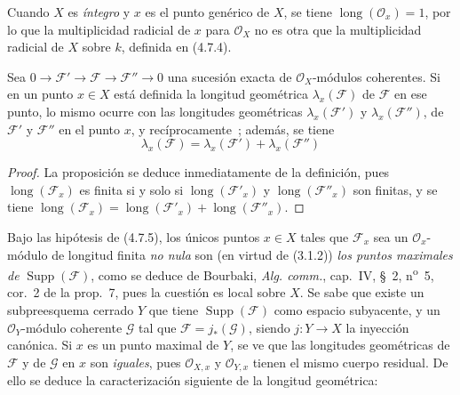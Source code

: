 Cuando $X$ es \emph{íntegro} y $x$ es el punto genérico de $X$, se tiene
$\operatorname{long}(\mathcal O_x)=1$, por lo que la multiplicidad radicial de
$x$ para $\mathcal O_X$ no es otra que la multiplicidad radicial de $X$ sobre
$k$, definida en (4.7.4).


\begin{proposition}[4.7.6]
\label{IV.2.4.7.6-fr}
Sea
$0\longrightarrow\mathscr F'\longrightarrow\mathscr F
\longrightarrow\mathscr F''\longrightarrow0$
una sucesión exacta de $\mathcal O_X$-módulos coherentes. Si en un punto
$x\in X$ está definida la longitud geométrica $\lambda_x(\mathscr F)$ de
$\mathscr F$ en ese punto, lo mismo ocurre con las longitudes geométricas
$\lambda_x(\mathscr F')$ y $\lambda_x(\mathscr F'')$, de $\mathscr F'$ y
$\mathscr F''$ en el punto $x$, y recíprocamente~; además, se tiene
\begin{equation}
\lambda_x(\mathscr F)=\lambda_x(\mathscr F')+\lambda_x(\mathscr F'')
\tag{4.7.6.1}
\label{IV.2.4.7.6.1-fr}
\end{equation}
\end{proposition}

\begin{proof}
La proposición se deduce inmediatamente de la definición, pues
$\operatorname{long}(\mathscr F_x)$ es finita si y solo si
$\operatorname{long}(\mathscr F'_x)$ y
$\operatorname{long}(\mathscr F''_x)$ son finitas, y se tiene
$\operatorname{long}(\mathscr F_x)
=\operatorname{long}(\mathscr F'_x)+\operatorname{long}(\mathscr F''_x)$.
\end{proof}

\begin{env}[4.7.7]
\label{IV.2.4.7.7-fr}
Bajo las hipótesis de (4.7.5), los únicos puntos $x\in X$ tales que
$\mathscr F_x$ sea un $\mathcal O_x$-módulo de longitud finita \emph{no nula} son
(en virtud de (3.1.2)) \emph{los puntos maximales de}
$\operatorname{Supp}(\mathscr F)$, como se deduce de Bourbaki,
\emph{Alg. comm.}, cap.~IV, \S~2, n\textsuperscript{o}~5, cor.~2 de la
prop.~7, pues la cuestión es local sobre $X$. Se sabe que existe un
subpreesquema cerrado $Y$ que tiene $\operatorname{Supp}(\mathscr F)$ como
espacio subyacente, y un $\mathcal O_Y$-módulo coherente $\mathscr G$ tal que
$\mathscr F=j_*(\mathscr G)$, siendo $j:Y\to X$ la inyección canónica. Si $x$
es un punto maximal de $Y$, se ve que las longitudes geométricas de
$\mathscr F$ y de $\mathscr G$ en $x$ son \emph{iguales}, pues $\mathcal O_{X,x}$ y
$\mathcal O_{Y,x}$ tienen el mismo cuerpo residual. De ello se deduce la
caracterización siguiente de la longitud geométrica:
\end{env}
